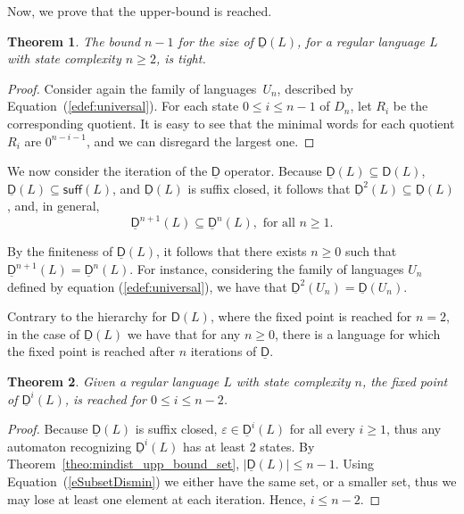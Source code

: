 \documentclass{article}
\newtheorem{theorem}{Theorem}
\newcommand{\card}[1]{|#1|}
\newcommand{\suff}[1]{\mathsf{suff}(#1)}
\newcommand{\dis}[1]{\mathsf{D}(#1)}
\newcommand{\distmin}[1]{\underline{\mathsf{D}}(#1)}
\newcommand{\distmino}{\underline{\mathsf{D}}}
\newcommand{\distminp}[2]{\underline{\mathsf{D}}^{#2}{(#1)}}
\begin{document}
Now, we prove that the upper-bound is reached.
\begin{theorem}
\label{theo:mindist_bound_tight}
    The bound $n-1$ for the size of $\distmin{L}$, for a
    regular language $L$ with state complexity $n\geq 2$, is tight. 
\end{theorem}
\begin{proof}
Consider again the family of languages~$U_n$, 
described by  Equation~(\ref{edef:universal}). 
For each state $0\leq i\leq n-1$ of $D_n$, let $R_i$ be 
the corresponding quotient. 
It is easy to see that the minimal words for each quotient $R_i$ are $0^{n-i-1}$, 
and we can disregard the largest one. 
 \end{proof}

We now consider the iteration of the $\distmino$ operator. 
Because $\distmin{L}\subseteq \dis{L}$, $\distmin{L}\subseteq \suff{L}$,
 and $\distmin{L}$ is suffix closed, it follows that
  $\distminp{L}{2}\subseteq \distmin{L}$, and,  in general, 
\begin{equation}
\label{eSubsetDismin}
\distminp{L}{n+1}\subseteq \distminp{L}{n},\mbox{ for  all }n\geq 1. 
\end{equation}

By the finiteness of $\distmin{L}$, it follows 
 that there exists $n\geq 0$ such that $\distminp{L}{n+1}= \distminp{L}{n}$.
  For instance, considering the family of languages 
$U_n$ defined by equation (\ref{edef:universal}), we have that  $\distminp{U_n}{2}=\distmin{U_n}$.

Contrary to the hierarchy for $\dis{L}$, where the fixed point is reached for $n=2$,
 in the case of $\distmin{L}$ we have that  for any $n\geq 0$, 
there is a language for which the fixed point is reached after $n$ iterations of $\distmino$.

\begin{theorem}
\label{theo:fpdismin}
Given a regular language $L$ with state complexity $n$, 
the fixed point of $\distminp{L}{i}$, is reached for $0\leq i\leq  n-2$. 
\end{theorem}

\begin{proof}
Because $\distmin{L}$ is suffix closed, 
$\varepsilon\in \distminp{L}{i}$ for all every $i\geq 1$, thus
any automaton recognizing $\distminp{L}{i}$ has at least 2 states.
By Theorem~\ref{theo:mindist_upp_bound_set}, 
$\card{\distmin{L}}\leq n-1$. 
Using Equation~(\ref{eSubsetDismin})
we either have the same set, or a smaller set, thus we may lose 
at least one element at each iteration. Hence, $i\leq n-2$.
\end{proof}
\end{document}
